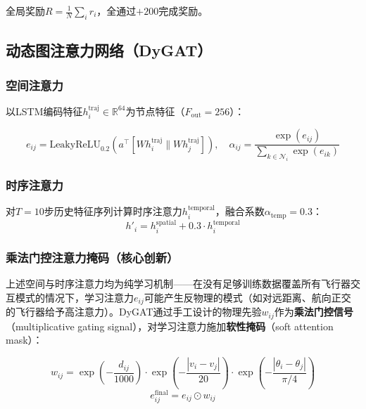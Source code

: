 \documentclass[12pt,a4paper,UTF8]{ctexart}
\begin{document}
全局奖励$R=\frac{1}{N}\sum_i r_i$，全通过$+200$完成奖励。

\subsection{动态图注意力网络（DyGAT）}

\subsubsection{空间注意力}

以LSTM编码特征$h_i^{\text{traj}}\in\mathbb{R}^{64}$为节点特征（$F_{\text{out}}=256$）：

\begin{equation}
    e_{ij} = \text{LeakyReLU}_{0.2}\!\left(a^{\top}[W h_i^{\text{traj}} \parallel W h_j^{\text{traj}}]\right),\quad
    \alpha_{ij} = \frac{\exp(e_{ij})}{\sum_{k\in\mathcal{N}_i}\exp(e_{ik})}
\end{equation}

\subsubsection{时序注意力}

对$T=10$步历史特征序列计算时序注意力$h_i^{\text{temporal}}$，融合系数$\alpha_{\text{temp}}=0.3$：
\begin{equation}
    h'_i = h_i^{\text{spatial}} + 0.3 \cdot h_i^{\text{temporal}}
\end{equation}

\subsubsection{乘法门控注意力掩码（核心创新）}

上述空间与时序注意力均为纯学习机制——在没有足够训练数据覆盖所有飞行器交互模式的情况下，学习注意力$e_{ij}$可能产生反物理的模式（如对远距离、航向正交的飞行器给予高注意力）。DyGAT通过手工设计的物理先验$w_{ij}$作为\textbf{乘法门控信号}（multiplicative gating signal），对学习注意力施加\textbf{软性掩码}（soft attention mask）：

\begin{equation}
    w_{ij} = \exp\!\left(-\frac{d_{ij}}{1000}\right) \cdot \exp\!\left(-\frac{|v_i - v_j|}{20}\right) \cdot \exp\!\left(-\frac{|\theta_i - \theta_j|}{\pi/4}\right)
\end{equation}
\begin{equation}
    e_{ij}^{\text{final}} = e_{ij} \odot w_{ij}
\end{equation}
\end{document}
